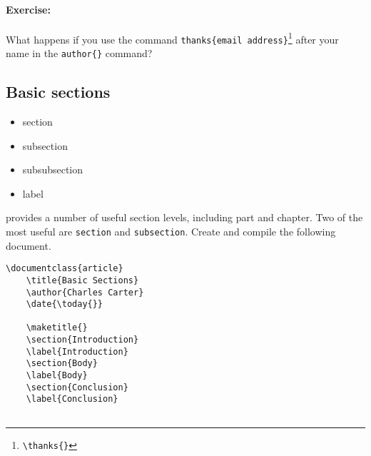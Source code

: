         \paragraph{Exercise:}What happens if you use the command \texttt{thanks\{email address\}}\footnote{\texttt{\textbackslash{}thanks\{\}}} after your name in the \texttt{author\{\}} command?

        \subsection{Basic sections}
        \label{Basic-sections}
        
        \begin{framed}
            \begin{itemize}
                \item{section}
                \item{subsection}
                \item{subsubsection}
                \item{label}
            \end{itemize}
        \end{framed}

        \LaTeXe{} provides a number of useful section levels, including part and chapter. Two of the most useful are \texttt{section} and \texttt{subsection}. Create and compile the following document.

        \begin{verbatim}
\documentclass{article}
    \title{Basic Sections}
    \author{Charles Carter}
    \date{\today{}}
 
    \maketitle{}
    \section{Introduction}
    \label{Introduction}
    \section{Body}
    \label{Body}
    \section{Conclusion}
    \label{Conclusion}
    
        \end{verbatim}

